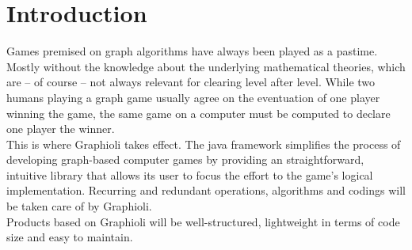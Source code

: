 \section{Introduction}
Games premised on \gls{graph} algorithms have always been played as a pastime. Mostly without the knowledge about the underlying mathematical theories, which are – of course – not always relevant for clearing level after level. While two humans playing a graph game usually agree on the eventuation of one player winning the game, the same game on a computer must be computed to declare one player the winner.\\

This is where Graphioli takes effect. The java framework simplifies the process of developing graph-based computer games by providing an straightforward, intuitive library that allows its user to focus the effort to the game's logical implementation. Recurring and redundant operations, algorithms and codings will be taken care of by Graphioli.\\

Products based on Graphioli will be well-structured, lightweight in terms of code size and easy to maintain.